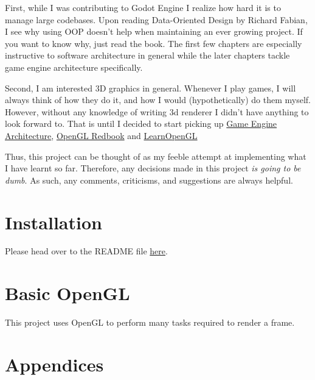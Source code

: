 \documentclass[a4paper,14pt]{extbook}
\begin{document}
First, while I was contributing to Godot Engine I realize how hard it is to manage large codebases.
Upon reading Data-Oriented Design by Richard Fabian, I see why using OOP doesn't help when maintaining an ever growing project.
If you want to know why, just read the book.
The first few chapters are especially instructive to software architecture in general while the later chapters tackle game engine architecture specifically.

Second, I am interested 3D graphics in general.
Whenever I play games, I will always think of how they do it, and how I would (hypothetically) do them myself.
However, without any knowledge of writing 3d renderer I didn't have anything to look forward to.
That is until I decided to start picking up \href{https://www.amazon.ca/Game-Engine-Architecture-Jason-Gregory/dp/1568814135}{Game Engine Architecture}, \href{https://www.cs.utexas.edu/users/fussell/courses/cs354/handouts/Addison.Wesley.OpenGL.Programming.Guide.8th.Edition.Mar.2013.ISBN.0321773039.pdf}{OpenGL Redbook} and \href{https://learnopengl.com}{LearnOpenGL}

Thus, this project can be thought of as my feeble attempt at implementing what I have learnt so far.
Therefore, any decisions made in this project \textit{is going to be dumb}.
As such, any comments, criticisms, and suggestions are always helpful.

\newpage
\section{Installation}

Please head over to the README file \href{run:./../README.md}{here}.

\newpage
\section{Basic OpenGL}

This project uses OpenGL to perform many tasks required to render a frame.
\section{Appendices}
\end{document}
